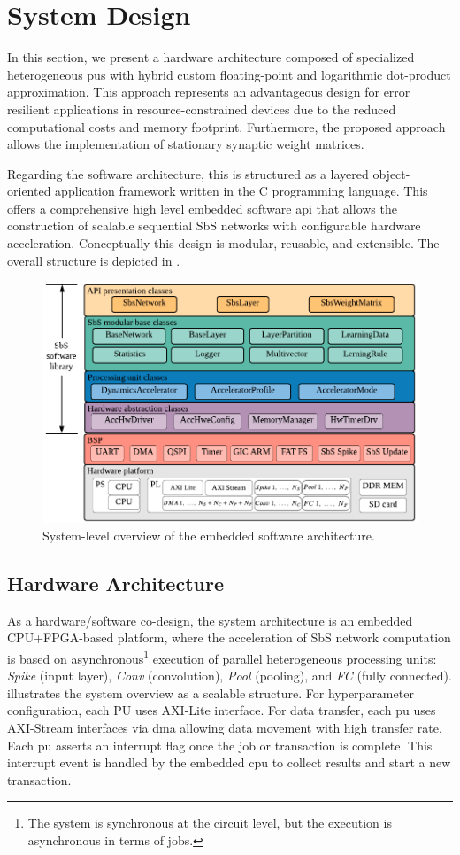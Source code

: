 \section{System Design}
\label{sec:system_design}

	In this section, we present a hardware architecture composed of specialized heterogeneous \glspl{pu} with hybrid custom floating-point and logarithmic dot-product approximation. This approach represents an advantageous design for error resilient applications in resource-constrained devices due to the reduced computational costs and memory footprint. Furthermore, the proposed approach allows the implementation of stationary synaptic weight matrices.
	

Regarding the software architecture, this is structured as a
layered object-oriented application framework written in the C programming language. This offers a comprehensive high level embedded software \gls{api} that allows the construction of scalable sequential SbS networks with configurable hardware acceleration. Conceptually this design is modular, reusable, and extensible. The overall structure is depicted in .

\begin{figure}[b!]
	\centering
	\includegraphics[width=0.5\columnwidth]{./chapters/sbs_accelerator/figures/sbs_software_component.pdf}
	\caption{System-level overview of the embedded software architecture.}
	\label{fig:sbs_sw_stack}
\end{figure}

\subsection{Hardware Architecture} \label{Hardware_architecture}
As a hardware/software co-design, the system architecture is an embedded CPU+FPGA-based platform, where the acceleration of SbS network computation is based on asynchronous\footnote{The system is synchronous at the circuit level, but the execution is asynchronous in terms of jobs.} execution of parallel heterogeneous processing units: \emph{Spike} (input layer), \emph{Conv} (convolution), \emph{Pool} (pooling), and \emph{FC} (fully connected).  illustrates the system overview as a scalable structure. For hyperparameter configuration, each PU uses AXI-Lite interface. For data transfer, each \gls{pu} uses AXI-Stream interfaces via \gls{dma} allowing data movement with high transfer rate. Each \gls{pu} asserts an interrupt flag once the job or transaction is complete. This interrupt event is handled by the embedded \gls{cpu} to collect results and start a new transaction.

